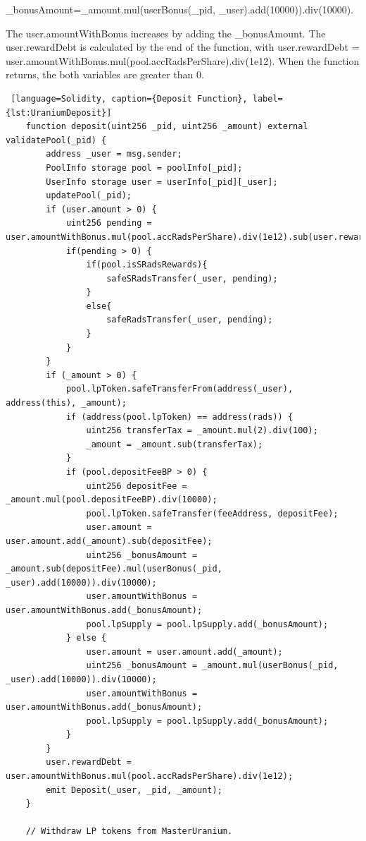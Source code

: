\_bonusAmount=\_amount.mul(userBonus(\_pid, \_user).add(10000)).div(10000).

The user.amountWithBonus increases by adding  the \_bonusAmount. 
The user.rewardDebt is calculated by the end of the function, with
user.rewardDebt = user.amountWithBonus.mul(pool.accRadsPerShare).div(1e12).
When the function returns, the  both variables are greater than 0.

\begin{lstlisting} [language=Solidity, caption={Deposit Function}, label={lst:UraniumDeposit}]
    function deposit(uint256 _pid, uint256 _amount) external validatePool(_pid) {
        address _user = msg.sender;
        PoolInfo storage pool = poolInfo[_pid];
        UserInfo storage user = userInfo[_pid][_user];
        updatePool(_pid);
        if (user.amount > 0) {
            uint256 pending = user.amountWithBonus.mul(pool.accRadsPerShare).div(1e12).sub(user.rewardDebt);
            if(pending > 0) {
                if(pool.isSRadsRewards){
                    safeSRadsTransfer(_user, pending);
                }
                else{
                    safeRadsTransfer(_user, pending);
                }
            }
        }
        if (_amount > 0) {
            pool.lpToken.safeTransferFrom(address(_user), address(this), _amount);
            if (address(pool.lpToken) == address(rads)) {
                uint256 transferTax = _amount.mul(2).div(100);
                _amount = _amount.sub(transferTax);
            }
            if (pool.depositFeeBP > 0) {
                uint256 depositFee = _amount.mul(pool.depositFeeBP).div(10000);
                pool.lpToken.safeTransfer(feeAddress, depositFee);
                user.amount = user.amount.add(_amount).sub(depositFee);
                uint256 _bonusAmount = _amount.sub(depositFee).mul(userBonus(_pid, _user).add(10000)).div(10000);
                user.amountWithBonus = user.amountWithBonus.add(_bonusAmount);
                pool.lpSupply = pool.lpSupply.add(_bonusAmount);
            } else {
                user.amount = user.amount.add(_amount);
                uint256 _bonusAmount = _amount.mul(userBonus(_pid, _user).add(10000)).div(10000);
                user.amountWithBonus = user.amountWithBonus.add(_bonusAmount);
                pool.lpSupply = pool.lpSupply.add(_bonusAmount);
            }
        }
        user.rewardDebt = user.amountWithBonus.mul(pool.accRadsPerShare).div(1e12);
        emit Deposit(_user, _pid, _amount);
    }

    // Withdraw LP tokens from MasterUranium.




\end{lstlisting} 


